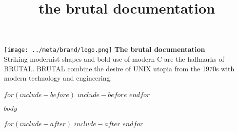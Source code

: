 \documentclass{book}
\title{\bigskip \bigskip the brutal documentation}
\date{}
\begin{document}
\begin{titlepage}
    \centering
    \texttt{[image: ../meta/brand/logo.png]}
    \vfill
    {\bfseries\Large
        The brutal documentation\\  
    }
    Striking modernist shapes and bold use of modern C are the hallmarks of BRUTAL.
    BRUTAL combine the desire of UNIX utopia from the 1970s with modern technology and engineering.
\end{titlepage}

\tableofcontents

\newpage

$for(include-before)$
$include-before$
$endfor$

$body$

$for(include-after)$
$include-after$
$endfor$
\end{document}
